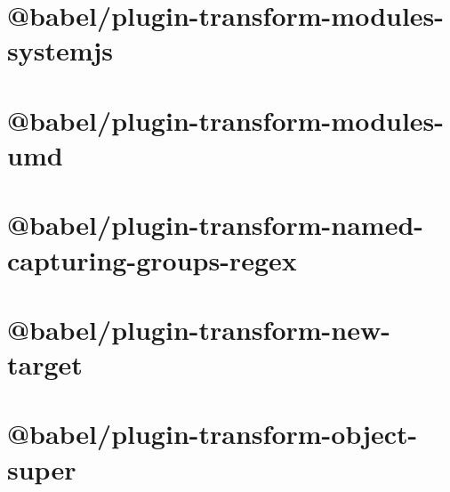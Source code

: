 \documentclass[twoside]{book}
\newcommand{\+}{\discretionary{\mbox{\scriptsize$\hookleftarrow$}}{}{}}
\begin{document}
\chapter{@babel/plugin-\/transform-\/modules-\/systemjs}
\label{md__c___users_vaishnavi_jadhav__desktop__developer_code_mean_stack_example_client_node_modules__c3984767897e3b7234a02257ca7ae282}

\chapter{@babel/plugin-\/transform-\/modules-\/umd}
\label{md__c___users_vaishnavi_jadhav__desktop__developer_code_mean_stack_example_client_node_modules__709d4901583be0267d5403677706ed65}

\chapter{@babel/plugin-\/transform-\/named-\/capturing-\/groups-\/regex}
\label{md__c___users_vaishnavi_jadhav__desktop__developer_code_mean_stack_example_client_node_modules__2590733f0b903b5aab99e7ae23ec2b2c}

\chapter{@babel/plugin-\/transform-\/new-\/target}
\label{md__c___users_vaishnavi_jadhav__desktop__developer_code_mean_stack_example_client_node_modules__5d6ca67b253a68d10b8c7080ab673fcc}

\chapter{@babel/plugin-\/transform-\/object-\/super}
\label{md__c___users_vaishnavi_jadhav__desktop__developer_code_mean_stack_example_client_node_modules__4946d6bb35dceb2d3aea3d47d692eda8}

\end{document}
